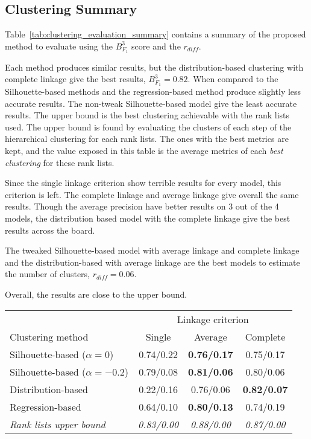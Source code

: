 \subsection{Clustering Summary}

Table~\ref{tab:clustering_evaluation_summary} contains a summary of the proposed method to evaluate using the $B^3_{F_1}$ score and the $r_{diff}$.

Each method produces similar results, but the distribution-based clustering with complete linkage give the best results, $B^3_{F_1} = 0.82$.
When compared to the Silhouette-based methods and the regression-based method produce slightly less accurate results.
The non-tweak Silhouette-based model give the least accurate results.
The upper bound is the best clustering achievable with the rank lists used.
The upper bound is found by evaluating the clusters of each step of the hierarchical clustering for each rank lists.
The ones with the best metrics are kept, and the value exposed in this table is the average metrics of each \textit{best clustering} for these rank lists.

Since the single linkage criterion show terrible results for every model, this criterion is left.
The complete linkage and average linkage give overall the same results.
Though the average precision have better results on 3 out of the 4 models, the distribution based model with the complete linkage give the best results across the board.

The tweaked Silhouette-based model with average linkage and complete linkage and the distribution-based with average linkage are the best models to estimate the number of clusters, $r_{diff} = 0.06$.

Overall, the results are close to the upper bound.

\begin{table*}[t]
  \centering
  \caption{Mean retained rank lists $B^{3}_{F_1}$/$r_{diff}$ for each corpus pair}
  \label{tab:clustering_evaluation_summary}
  \begin{tabular}{l c c c}
    \toprule
                                       & \multicolumn{3}{c}{Linkage criterion} \\
    Clustering method                  & Single         & Average            & Complete \\
    \midrule
    Silhouette-based ($\alpha = 0$)    & 0.74/0.22      & \textbf{0.76/0.17} & 0.75/0.17 \\
    Silhouette-based ($\alpha = -0.2$) & 0.79/0.08      & \textbf{0.81/0.06} & 0.80/0.06 \\
    Distribution-based                 & 0.22/0.16      & 0.76/0.06          & \textbf{0.82/0.07} \\
    Regression-based                   & 0.64/0.10      & \textbf{0.80/0.13} & 0.74/0.19 \\
    \midrule
    \textit{Rank lists upper bound}    & \textit{0.83/0.00} & \textit{0.88/0.00} & \textit{0.87/0.00} \\
    \bottomrule
  \end{tabular}
\end{table*}

